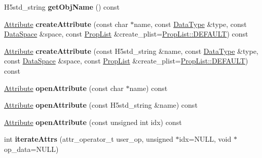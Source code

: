 \begin{DoxyCompactItemize}
\item 
\mbox{\label{class_h5_1_1_h5_object_af87e012949a2c19c58fed87c2657565a}} 
H5std\+\_\+string {\bfseries get\+Obj\+Name} () const
\item 
\mbox{\label{class_h5_1_1_h5_object_acf6c4ca827b3cc08592d78c4b65252d6}} 
\hyperlink{class_h5_1_1_attribute}{Attribute} {\bfseries create\+Attribute} (const char $\ast$name, const \hyperlink{class_h5_1_1_data_type}{Data\+Type} \&type, const \hyperlink{class_h5_1_1_data_space}{Data\+Space} \&space, const \hyperlink{class_h5_1_1_prop_list}{Prop\+List} \&create\+\_\+plist=\hyperlink{class_h5_1_1_prop_list_ae52af66ce82af0ea7e6dc57148c56241}{Prop\+List\+::\+D\+E\+F\+A\+U\+LT}) const
\item 
\mbox{\label{class_h5_1_1_h5_object_a20cba569ffbb46859164668ab536b38f}} 
\hyperlink{class_h5_1_1_attribute}{Attribute} {\bfseries create\+Attribute} (const H5std\+\_\+string \&name, const \hyperlink{class_h5_1_1_data_type}{Data\+Type} \&type, const \hyperlink{class_h5_1_1_data_space}{Data\+Space} \&space, const \hyperlink{class_h5_1_1_prop_list}{Prop\+List} \&create\+\_\+plist=\hyperlink{class_h5_1_1_prop_list_ae52af66ce82af0ea7e6dc57148c56241}{Prop\+List\+::\+D\+E\+F\+A\+U\+LT}) const
\item 
\mbox{\label{class_h5_1_1_h5_object_a0327a8a39d3578db30c050472e662c33}} 
\hyperlink{class_h5_1_1_attribute}{Attribute} {\bfseries open\+Attribute} (const char $\ast$name) const
\item 
\mbox{\label{class_h5_1_1_h5_object_aa694dbcac2a59f39be6fba61d03793c4}} 
\hyperlink{class_h5_1_1_attribute}{Attribute} {\bfseries open\+Attribute} (const H5std\+\_\+string \&name) const
\item 
\mbox{\label{class_h5_1_1_h5_object_a762bab75b1c150e3928f66d3d65d2269}} 
\hyperlink{class_h5_1_1_attribute}{Attribute} {\bfseries open\+Attribute} (const unsigned int idx) const
\item 
\mbox{\label{class_h5_1_1_h5_object_a06836076a40d8677256dbd89563e7578}} 
int {\bfseries iterate\+Attrs} (attr\+\_\+operator\+\_\+t user\+\_\+op, unsigned $\ast$idx=N\+U\+LL, void $\ast$op\+\_\+data=N\+U\+LL)

\end{DoxyCompactItemize}
